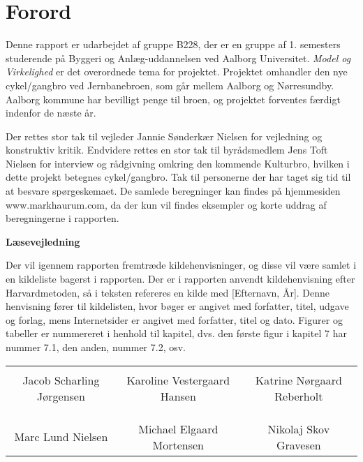 \chapter*{Forord}
Denne rapport er udarbejdet af gruppe B228, der er en gruppe af 1. semesters studerende på Byggeri og Anlæg-uddannelsen ved Aalborg Universitet. \textit{Model og Virkelighed} er det overordnede tema for projektet.
Projektet omhandler den nye cykel/gangbro ved Jernbanebroen, som går mellem Aalborg og Nørresundby. Aalborg kommune har bevilligt penge til broen, og projektet forventes færdigt indenfor de næste år.

Der rettes stor tak til vejleder Jannie Sønderkær Nielsen for vejledning og konstruktiv kritik. Endvidere rettes en stor tak til byrådsmedlem Jens Toft Nielsen for interview og rådgivning omkring den kommende Kulturbro, hvilken i dette projekt betegnes cykel/gangbro. Tak til personerne der har taget sig tid til at besvare spørgeskemaet. 
De samlede beregninger kan findes på hjemmesiden www.markhaurum.com, da der kun vil findes eksempler og korte uddrag af beregningerne i rapporten. 

\textbf{Læsevejledning}

Der vil igennem rapporten fremtræde kildehenvisninger, og disse vil være samlet i en kildeliste bagerst i rapporten. Der er i rapporten anvendt kildehenvisning efter Harvardmetoden, så i teksten refereres en kilde med [Efternavn, År]. Denne henvisning fører til kildelisten, hvor bøger er angivet med forfatter, titel, udgave og forlag, mens Internetsider er angivet med forfatter, titel og dato. Figurer og tabeller er nummereret i henhold til kapitel, dvs. den første figur i kapitel 7 har nummer 7.1, den anden, nummer 7.2, osv. 

\phantom{Luft}

\phantom{Luft}

\begin{table}[H]
	\centering
		\begin{tabular}{c c c}
			\underline{\phantom{mmmmmmmmmmmmmm}} & \underline{\phantom{mmmmmmmmmmmmmm}} & \underline{\phantom{mmmmmmmmmmmmmm}} \\
			Jacob Scharling Jørgensen			& Karoline Vestergaard Hansen 		& Katrine Nørgaard Reberholt 			\\
			&&\\
			&&\\
			\underline{\phantom{mmmmmmmmmmmmmm}} & \underline{\phantom{mmmmmmmmmmmmmm}} & \underline{\phantom{mmmmmmmmmmmmmm}} \\
			Marc Lund Nielsen			& Michael Elgaard Mortensen 		& Nikolaj Skov Gravesen 				\\
												
		\end{tabular}
\end{table}
